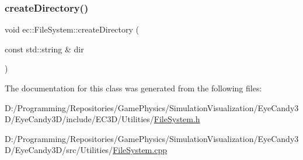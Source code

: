\subsubsection{\texorpdfstring{create\+Directory()}{createDirectory()}}
{\footnotesize\ttfamily void ec\+::\+File\+System\+::create\+Directory (\begin{DoxyParamCaption}\item[{const std\+::string \&}]{dir }\end{DoxyParamCaption})\hspace{0.3cm}{\ttfamily [static]}}



The documentation for this class was generated from the following files\+:\begin{DoxyCompactItemize}
\item 
D\+:/\+Programming/\+Repositories/\+Game\+Physics/\+Simulation\+Visualization/\+Eye\+Candy3\+D/\+Eye\+Candy3\+D/include/\+E\+C3\+D/\+Utilities/\mbox{\hyperlink{_file_system_8h}{File\+System.\+h}}\item 
D\+:/\+Programming/\+Repositories/\+Game\+Physics/\+Simulation\+Visualization/\+Eye\+Candy3\+D/\+Eye\+Candy3\+D/src/\+Utilities/\mbox{\hyperlink{_file_system_8cpp}{File\+System.\+cpp}}\end{DoxyCompactItemize}
